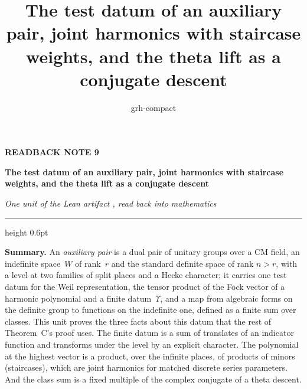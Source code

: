 \documentclass[11pt,a4paper]{article}
\title{The test datum of an auxiliary pair, joint harmonics with staircase weights, and the theta lift as a conjugate descent}
\author{grh-compact}
\date{}
\newcommand{\m}[1]{\mbox{$#1$}}        %
\theoremstyle{plainx}
\theoremstyle{uprightx}
\begin{document}
\color{ink}

{\raggedright
{\sffamily\bfseries\fontsize{7.2}{9}\selectfont\color{leancol}READBACK NOTE 9\par}
\vspace{5pt}
{\fontsize{21.5}{25.5}\selectfont\bfseries The test datum of an auxiliary pair, joint harmonics with staircase weights, and the theta lift as a conjugate descent\par}
\vspace{5pt}
{\fontsize{12.4}{16}\selectfont\itshape\color{inksoft} One unit of the Lean artifact \ArtifactName, read back into
mathematics\par}}
\vspace{8pt}
{\color{rulegrey}\hrule height 0.6pt}
\vspace{7pt}
\thispagestyle{empty}

\textbf{Summary.} An \emph{auxiliary pair} is a dual pair of unitary groups over a CM field, an indefinite space~$W$
of rank~$r$ and the standard definite space of rank \m{n>r}, with a level at two families of split places and
a Hecke character; it carries one test datum for the Weil representation, the tensor product of the Fock vector of a
harmonic polynomial and a finite datum~$\Upsilon$, and a map from algebraic forms on the definite group to
functions on the indefinite one, defined as a finite sum over classes. This unit proves the three facts about
this datum that the rest of Theorem~C's proof uses. The finite datum is a sum of translates of an indicator
function and transforms under the level by an explicit character. The polynomial at the highest vector is a
product, over the infinite places, of products of minors (staircases), which are joint harmonics for matched
discrete series parameters. And the class sum is a fixed multiple of the complex conjugate of a theta descent.
\end{document}

